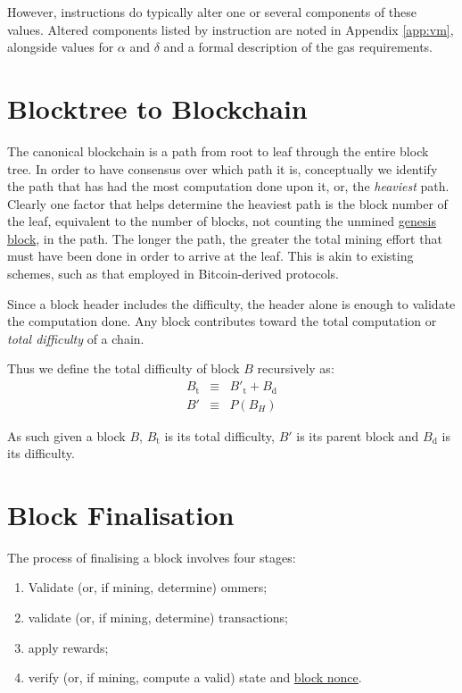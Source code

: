 \documentclass[9pt,oneside]{amsart}
\begin{document}
\begin{multicols}{2}
However, instructions do typically alter one or several components of these values. Altered components listed by instruction are noted in Appendix \ref{app:vm}, alongside values for $\alpha$ and $\delta$ and a formal description of the gas requirements.

\section{Blocktree to Blockchain} \label{ch:ghost}

The canonical blockchain is a path from root to leaf through the entire block tree. In order to have consensus over which path it is, conceptually we identify the path that has had the most computation done upon it, or, the \textit{heaviest} path. Clearly one factor that helps determine the heaviest path is the block number of the leaf, equivalent to the number of blocks, not counting the unmined \hyperlink{Genesis_Block}{genesis block}, in the path. The longer the path, the greater the total mining effort that must have been done in order to arrive at the leaf. This is akin to existing schemes, such as that employed in Bitcoin-derived protocols.

Since a block header includes the difficulty, the header alone is enough to validate the computation done. Any block contributes toward the total computation or \textit{total difficulty} of a chain.

Thus we define the total difficulty of block $B$ recursively as:
\begin{eqnarray}
B_{\mathrm{t}} & \equiv & B'_{\mathrm{t}} + B_{\mathrm{d}} \\
B' & \equiv & P(B_{H})
\end{eqnarray}

As such given a block $B$, $B_{\mathrm{t}}$ is its total difficulty, $B'$ is its parent block and $B_{\mathrm{d}}$ is its difficulty.

\section{Block Finalisation} \label{ch:finalisation}

The process of finalising a block involves four stages:

\begin{enumerate}
\item Validate (or, if mining, determine) ommers;
\item validate (or, if mining, determine) transactions;
\item apply rewards;
\item verify (or, if mining, compute a valid) state and \hyperlink{block_nonce}{block nonce}.
\end{enumerate}


\end{multicols}
\end{document}
